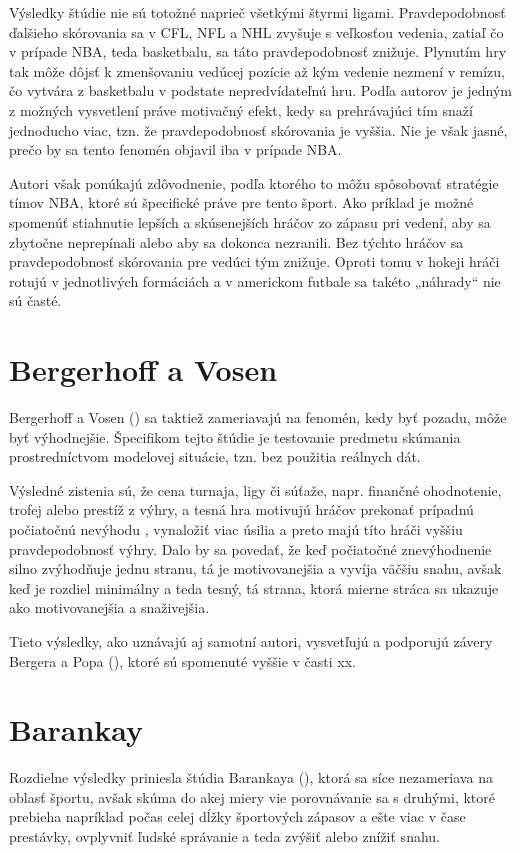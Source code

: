 \documentclass[
  digital, %
  oneside, %
  notable,   %
  lof,     %
  lot,     %
]{fithesis3}
\begin{document}
		Výsledky štúdie nie sú totožné naprieč všetkými štyrmi ligami. Pravdepodobnosť ďalšieho skórovania sa v CFL, NFL a NHL zvyšuje s veľkosťou vedenia, zatiaľ čo v prípade NBA, teda basketbalu, sa táto pravdepodobnosť znižuje. Plynutím hry  tak môže dôjsť k zmenšovaniu vedúcej pozície až kým vedenie nezmení v remízu, čo vytvára z basketbalu v podstate nepredvídateľnú hru. Podľa autorov je jedným z možných vysvetlení práve motivačný efekt, kedy sa prehrávajúci tím snaží  jednoducho viac, tzn. že pravdepodobnosť skórovania je vyššia. Nie je však jasné, prečo by sa tento fenomén objavil iba v prípade NBA. \parencite[s.~18]{merritt2014}
	
		Autori však ponúkajú zdôvodnenie, podľa ktorého to môžu spôsobovať stratégie tímov NBA, ktoré sú špecifické práve pre tento šport. Ako príklad je možné spomenúť stiahnutie lepších a skúsenejších hráčov zo zápasu pri vedení, aby sa zbytočne neprepínali  alebo aby sa dokonca nezranili. Bez týchto hráčov sa pravdepodobnosť skórovania pre vedúci tým znižuje. Oproti tomu v hokeji hráči rotujú v jednotlivých formáciách a v americkom futbale sa takéto „náhrady“ nie sú časté. \parencite[s.~19]{merritt2014}
	
		\section{Bergerhoff a Vosen}
		Bergerhoff a Vosen (\citeyear{bergerhoff2015}) sa taktiež zameriavajú na fenomén, kedy byť pozadu, môže byť výhodnejšie. Špecifikom tejto štúdie je testovanie predmetu skúmania prostredníctvom modelovej situácie, tzn. bez použitia reálnych dát.
		
		Výsledné zistenia sú, že cena turnaja, ligy či súťaže, napr. finančné ohodnotenie, trofej alebo prestíž z výhry, a tesná hra motivujú hráčov prekonať prípadnú počiatočnú nevýhodu , vynaložiť viac úsilia a preto majú títo hráči vyššiu pravdepodobnosť výhry. \parencite[s.~20]{bergerhoff2015} Dalo by sa povedať, že keď počiatočné znevýhodnenie silno zvýhodňuje jednu stranu, tá je motivovanejšia a vyvíja väčšiu snahu, avšak keď je rozdiel minimálny a teda tesný, tá strana, ktorá mierne stráca sa ukazuje ako motivovanejšia a snaživejšia.
		
		Tieto výsledky, ako uznávajú aj samotní autori, vysvetľujú a podporujú závery Bergera a Popa (\citeyear{berger2011}), ktoré sú spomenuté vyššie v časti xx.
		
		\section{Barankay}
		Rozdielne výsledky priniesla štúdia Barankaya (\citeyear{barankay2010}), ktorá sa síce nezameriava na oblasť športu, avšak skúma do akej miery vie porovnávanie sa s druhými, ktoré prebieha napríklad počas celej dĺžky športových zápasov a ešte viac v čase prestávky, ovplyvniť ľudské správanie a teda zvýšiť alebo znížiť snahu.
		
\end{document}
